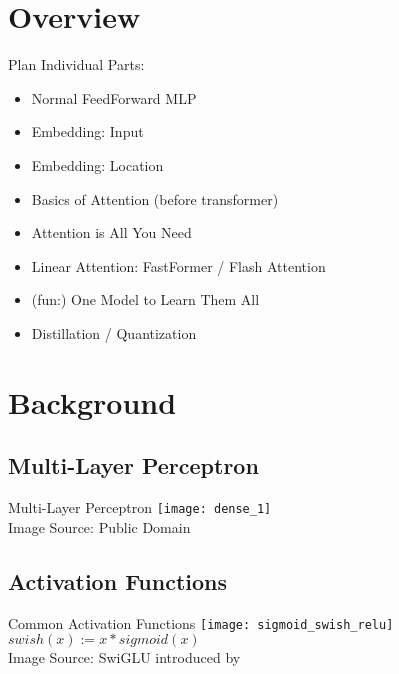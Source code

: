 \section{Overview}
\begin{frame}[c]{Plan}
    Individual Parts:
    \begin{itemize}[<+(1)->]
        \item Normal FeedForward MLP
        \item Embedding: Input
        \item Embedding: Location
        \item Basics of Attention (before transformer)
        \item Attention is All You Need \cite{vaswani_attention_2017}
        \item Linear Attention: FastFormer \cite{wu_fastformer_2021} / Flash Attention \cite{hua_transformer_2022}

        \item (fun:) One Model to Learn Them All \cite{kaiser_one_2017}
        \item Distillation / Quantization \cite{polino_model_2018}
    \end{itemize}
\end{frame}


\section{Background}
\subsection{Multi-Layer Perceptron}
\begin{frame}[c]{Multi-Layer Perceptron}
    \texttt{[image: dense\_1]} \\
    \normalsize
    Image Source: Public Domain
\end{frame}

\subsection{Activation Functions}
\begin{frame}[c]{Common Activation Functions}
    \texttt{[image: sigmoid\_swish\_relu]} \\
    $swish(x) := x * sigmoid(x)$ \\
    Image Source: \cite{chen_deep_2021} \hspace{1cm}
    SwiGLU introduced by \cite{shazeer_glu_2020}
\end{frame}

